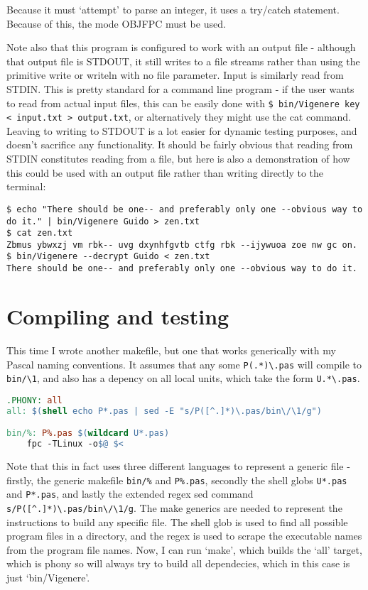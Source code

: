 \documentclass{article}
\begin{document}
    Because it must `attempt' to parse an integer, it uses a try/catch
    statement. Because of this, the mode OBJFPC must be used.

    Note also that this program is configured to work with an output file -
    although that output file is STDOUT, it still writes to a file streams
    rather than using the primitive write or writeln with no file parameter.
    Input is similarly read from STDIN. This is pretty standard for a command
    line program - if the user wants to read from actual input files, this can
    be easily done with \verb|$ bin/Vigenere key < input.txt > output.txt|, or
    alternatively they might use the cat command. Leaving to writing to STDOUT
    is a lot easier for dynamic testing purposes, and doesn't sacrifice any
    functionality.  It should be fairly obvious that reading from STDIN
    constitutes reading from a file, but here is also a demonstration of how
    this could be used with an output file rather than writing directly to the
    terminal:

\begin{lstlisting}[caption=Use of an output file]
$ echo "There should be one-- and preferably only one --obvious way to do it." | bin/Vigenere Guido > zen.txt
$ cat zen.txt 
Zbmus ybwxzj vm rbk-- uvg dxynhfgvtb ctfg rbk --ijywuoa zoe nw gc on.
$ bin/Vigenere --decrypt Guido < zen.txt
There should be one-- and preferably only one --obvious way to do it.
\end{lstlisting}
\iffalse $ \fi %

    \section{Compiling and testing}

    This time I wrote another makefile, but one that works generically with my
    Pascal naming conventions. It assumes that any some \verb|P(.*)\.pas| will
    compile to \verb|bin/\1|, and also has a depency on all local units, which
    take the form \verb|U.*\.pas|.

\begin{lstlisting}[language=make, caption=The generic FPC makefile]
.PHONY: all
all: $(shell echo P*.pas | sed -E "s/P([^.]*)\.pas/bin\/\1/g")

bin/%: P%.pas $(wildcard U*.pas)
	fpc -TLinux -o$@ $<
\end{lstlisting}
\iffalse $ \fi %

    Note that this in fact uses three different languages to represent a
    generic file - firstly, the generic makefile \verb|bin/%| and
    \verb|P%.pas|, secondly the shell globs \verb|U*.pas| and \verb|P*.pas|,
    and lastly the extended regex sed command \verb|s/P([^.]*)\.pas/bin\/\1/g|.
    The make generics are needed to represent the instructions to build any
    specific file. The shell glob is used to find all possible program files in
    a directory, and the regex is used to scrape the executable names from the
    program file names. Now, I can run `make', which builds the `all' target,
    which is phony so will always try to build all dependecies, which in this
    case is just `bin/Vigenere'.
\end{document}
